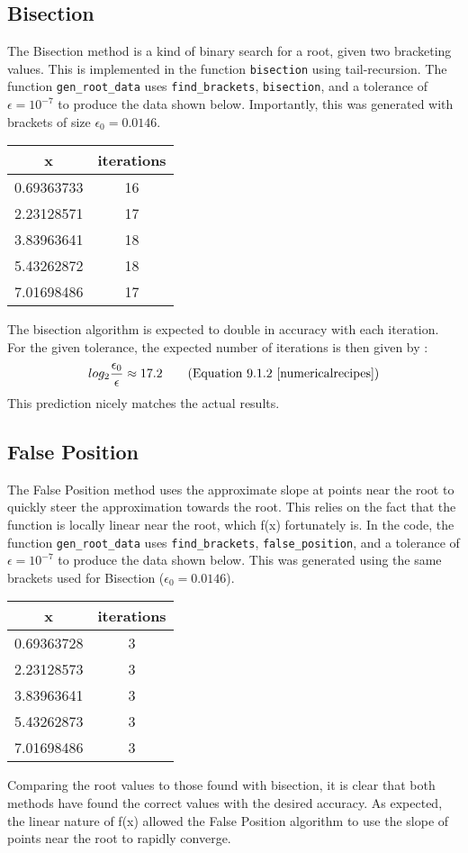 \documentclass[12pt]{article}
\begin{document}
\subsection{Bisection}
The Bisection method is a kind of binary search for a root, given two bracketing values. This is implemented in the function \texttt{bisection} using tail-recursion. The function \texttt{gen\_root\_data} uses \texttt{find\_brackets}, \texttt{bisection}, and a tolerance of $\epsilon = 10^{-7}$ to produce the data shown below. Importantly, this was generated with brackets of size $\epsilon_0 = 0.0146$.
\begin{center}
\begin{tabular}{ c | c }
x & iterations \\ \hline
0.69363733 & 16 \\
2.23128571 & 17 \\
3.83963641 & 18 \\
5.43262872 & 18 \\
7.01698486 & 17 \\
\end{tabular}
\end{center}
The bisection algorithm is expected to double in accuracy with each iteration. For the given tolerance, the expected number of iterations is then given by :
\begin{equation*}
log_2{\frac{\epsilon_0}{\epsilon}} \approx 17.2
\tag{Equation 9.1.2 \cite{numericalrecipes}}
\end{equation*}
This prediction nicely matches the actual results.
\subsection{False Position}
The False Position method uses the approximate slope at points near the root to quickly steer the approximation towards the root. This relies on the fact that the function is locally linear near the root, which f(x) fortunately is. In the code, the function \texttt{gen\_root\_data} uses \texttt{find\_brackets}, \texttt{false\_position}, and a tolerance of $\epsilon = 10^{-7}$ to produce the data shown below. This was generated using the same brackets used for Bisection ($\epsilon_0 = 0.0146$).
\begin{center}
\begin{tabular}{ c | c }
x & iterations \\ \hline
0.69363728 & 3 \\
2.23128573 & 3 \\
3.83963641 & 3 \\
5.43262873 & 3 \\
7.01698486 & 3 \\
\end{tabular}
\end{center}
Comparing the root values to those found with bisection, it is clear that both methods have found the correct values with the desired accuracy. As expected, the linear nature of f(x) allowed the False Position algorithm to use the slope of points near the root to rapidly converge.
\clearpage
\end{document}
